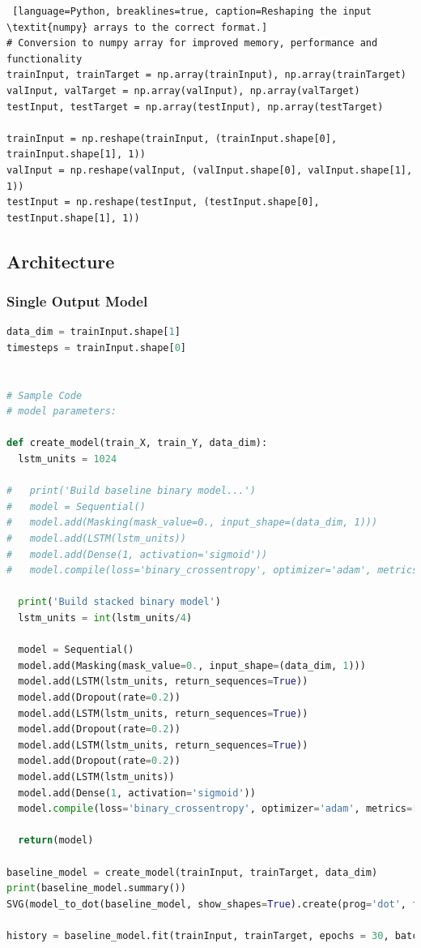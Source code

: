\documentclass[10pt,onecolumn,letterpaper]{article}
\begin{document}
\begin{lstlisting} [language=Python, breaklines=true, caption=Reshaping the input \textit{numpy} arrays to the correct format.]
# Conversion to numpy array for improved memory, performance and functionality
trainInput, trainTarget = np.array(trainInput), np.array(trainTarget)
valInput, valTarget = np.array(valInput), np.array(valTarget)
testInput, testTarget = np.array(testInput), np.array(testTarget)

trainInput = np.reshape(trainInput, (trainInput.shape[0], trainInput.shape[1], 1))
valInput = np.reshape(valInput, (valInput.shape[0], valInput.shape[1], 1))
testInput = np.reshape(testInput, (testInput.shape[0], testInput.shape[1], 1))
\end{lstlisting} 

\subsection{Architecture} 
\subsubsection{Single Output Model}

\begin{lstlisting}[language=Python, breaklines=true, caption={Model creation, compilation and fitting functionality of the single output model. The initial single hidden layer model is commented out.}]
data_dim = trainInput.shape[1]
timesteps = trainInput.shape[0]


# Sample Code
# model parameters:

def create_model(train_X, train_Y, data_dim):
  lstm_units = 1024
  
#   print('Build baseline binary model...')
#   model = Sequential()
#   model.add(Masking(mask_value=0., input_shape=(data_dim, 1)))
#   model.add(LSTM(lstm_units))
#   model.add(Dense(1, activation='sigmoid'))
#   model.compile(loss='binary_crossentropy', optimizer='adam', metrics=['accuracy'])
  
  print('Build stacked binary model')
  lstm_units = int(lstm_units/4)

  model = Sequential()
  model.add(Masking(mask_value=0., input_shape=(data_dim, 1)))
  model.add(LSTM(lstm_units, return_sequences=True))
  model.add(Dropout(rate=0.2))
  model.add(LSTM(lstm_units, return_sequences=True))
  model.add(Dropout(rate=0.2))
  model.add(LSTM(lstm_units, return_sequences=True))
  model.add(Dropout(rate=0.2))
  model.add(LSTM(lstm_units))
  model.add(Dense(1, activation='sigmoid'))
  model.compile(loss='binary_crossentropy', optimizer='adam', metrics=['accuracy'])

  return(model)

baseline_model = create_model(trainInput, trainTarget, data_dim)
print(baseline_model.summary())
SVG(model_to_dot(baseline_model, show_shapes=True).create(prog='dot', format='svg'))

history = baseline_model.fit(trainInput, trainTarget, epochs = 30, batch_size = 1024, verbose = 1)

\end{lstlisting} 
\end{document}
